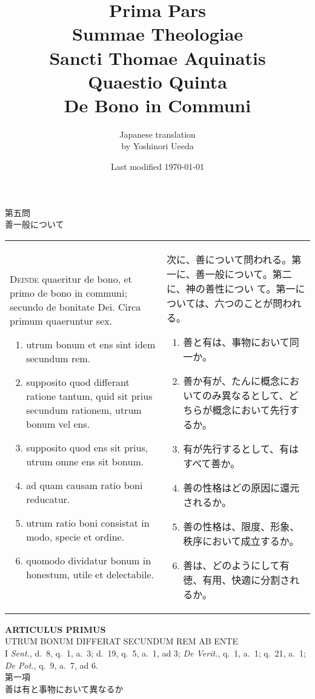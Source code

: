 \documentclass[10pt]{jsarticle} %
\title{{\bf Prima Pars}\\{\HUGE Summae Theologiae}\\Sancti Thomae
Aquinatis\\Quaestio Quinta\\{\bf De Bono in Communi}}
\author{Japanese translation\\by Yoshinori {\sc Ueeda}}
\date{Last modified \today}
\begin{document}
\maketitle
\begin{center}
 {\Large 第五問\\善一般について}
\end{center}
\begin{longtable}{p{21em}p{21em}}
{\scshape Deinde} quaeritur de bono, et primo de bono in communi;
 secundo de bonitate Dei. Circa primum quaeruntur sex. 
\begin{enumerate}
 \item utrum
 bonum et ens sint idem secundum rem.
 \item supposito quod differant
 ratione tantum, quid sit prius secundum rationem, utrum bonum vel
 ens.
 \item supposito quod ens sit prius, utrum omne ens sit
 bonum.
 \item ad quam causam ratio boni reducatur. 
 \item utrum ratio
 boni consistat in modo, specie et ordine.
 \item quomodo dividatur
 bonum in honestum, utile et delectabile.
\end{enumerate}

&

次に、善について問われる。第一に、善一般について。第二に、神の善性につい
 て。第一については、六つのことが問われる。

\begin{enumerate}
 \item 善と有は、事物において同一か。
 \item 善か有が、たんに概念においてのみ異なるとして、どちらが概念において先行するか。       
 \item 有が先行するとして、有はすべて善か。
 \item 善の性格はどの原因に還元されるか。
 \item 善の性格は、限度、形象、秩序において成立するか。
 \item 善は、どのようにして有徳、有用、快適に分割されるか。
\end{enumerate}

\end{longtable}

\newpage
{}

\begin{center}
 {\Large {\bf ARTICULUS PRIMUS}}\\
 {\large UTRUM BONUM DIFFERAT SECUNDUM REM AB ENTE}\\
 {\footnotesize I {\itshape Sent.}, d.~8, q.~1, a.~3; d.~19, q.~5, a.~1,
 ad 3; {\itshape De Verit.}, q.~1, a.~1; q.~21, a.~1; {\itshape De
 Pot.}, q.~9, a.~7, ad 6.}\\
 {\Large 第一項\\善は有と事物において異なるか}
\end{center}
\end{document}
